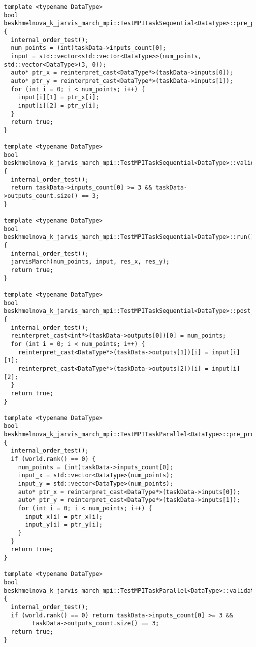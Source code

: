 \documentclass[a4paper,12pt]{article}
\begin{document}
{\begin{lstlisting}
template <typename DataType>
bool beskhmelnova_k_jarvis_march_mpi::TestMPITaskSequential<DataType>::pre_processing() {
  internal_order_test();
  num_points = (int)taskData->inputs_count[0];
  input = std::vector<std::vector<DataType>>(num_points, std::vector<DataType>(3, 0));
  auto* ptr_x = reinterpret_cast<DataType*>(taskData->inputs[0]);
  auto* ptr_y = reinterpret_cast<DataType*>(taskData->inputs[1]);
  for (int i = 0; i < num_points; i++) {
    input[i][1] = ptr_x[i];
    input[i][2] = ptr_y[i];
  }
  return true;
}

template <typename DataType>
bool beskhmelnova_k_jarvis_march_mpi::TestMPITaskSequential<DataType>::validation() {
  internal_order_test();
  return taskData->inputs_count[0] >= 3 && taskData->outputs_count.size() == 3;
}

template <typename DataType>
bool beskhmelnova_k_jarvis_march_mpi::TestMPITaskSequential<DataType>::run() {
  internal_order_test();
  jarvisMarch(num_points, input, res_x, res_y);
  return true;
}

template <typename DataType>
bool beskhmelnova_k_jarvis_march_mpi::TestMPITaskSequential<DataType>::post_processing() {
  internal_order_test();
  reinterpret_cast<int*>(taskData->outputs[0])[0] = num_points;
  for (int i = 0; i < num_points; i++) {
    reinterpret_cast<DataType*>(taskData->outputs[1])[i] = input[i][1];
    reinterpret_cast<DataType*>(taskData->outputs[2])[i] = input[i][2];
  }
  return true;
}

template <typename DataType>
bool beskhmelnova_k_jarvis_march_mpi::TestMPITaskParallel<DataType>::pre_processing() {
  internal_order_test();
  if (world.rank() == 0) {
    num_points = (int)taskData->inputs_count[0];
    input_x = std::vector<DataType>(num_points);
    input_y = std::vector<DataType>(num_points);
    auto* ptr_x = reinterpret_cast<DataType*>(taskData->inputs[0]);
    auto* ptr_y = reinterpret_cast<DataType*>(taskData->inputs[1]);
    for (int i = 0; i < num_points; i++) {
      input_x[i] = ptr_x[i];
      input_y[i] = ptr_y[i];
    }
  }
  return true;
}

template <typename DataType>
bool beskhmelnova_k_jarvis_march_mpi::TestMPITaskParallel<DataType>::validation() {
  internal_order_test();
  if (world.rank() == 0) return taskData->inputs_count[0] >= 3 && 
		taskData->outputs_count.size() == 3;
  return true;
}


\end{lstlisting}}
\end{document}
